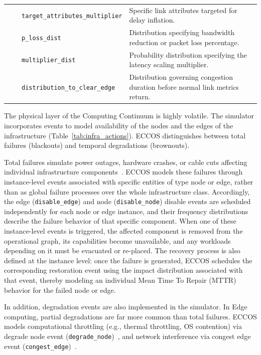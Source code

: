 \documentclass[ASNA]{USG} %
\begin{document}
\begin{center}
\begin{table}[!ht]
\begin{tabular*}{\textwidth}{@{\extracolsep\fill}ll l p{5cm}@{\extracolsep\fill}}
  & & \texttt{target\_attributes\_multiplier} & Specific link attributes targeted for delay inflation. \\
 & & \texttt{p\_loss\_dist} & Distribution specifying bandwidth reduction or packet loss percentage. \\
 & & \texttt{multiplier\_dist} & Probability distribution specifying the latency scaling multiplier. \\
 & & \texttt{distribution\_to\_clear\_edge} & Distribution governing congestion duration before normal link metrics return. \\
\bottomrule
\end{tabular*}
\end{table}
\end{center}


The physical layer of the Computing Continuum is highly volatile. The simulator incorporates events to model availability of the nodes and the edges of the infrastructure (Table~\ref{tab:infra_actions}). \textsc{ECCOS} distinguishes between total failures (blackouts) and temporal degradations (brownouts).


Total failures simulate power outages, hardware crashes, or cable cuts affecting individual infrastructure components~\cite{Pereira2021Availability}. \textsc{ECCOS} models these failures through instance-level events associated with specific entities of type node or edge, rather than as global failure processes over the whole infrastructure class. Accordingly, the edge (\texttt{disable\_edge}) and node (\texttt{disable\_node}) disable events are scheduled independently for each node or edge instance, and their frequency distributions describe the failure behavior of that specific component. When one of these instance-level events is triggered, the affected component is removed from the operational graph, its capabilities become unavailable, and any workloads depending on it must be evacuated or re-placed. The recovery process is also defined at the instance level: once the failure is generated, \textsc{ECCOS} schedules the corresponding restoration event using the impact distribution associated with that event, thereby modeling an individual Mean Time To Repair (MTTR) behavior for the failed node or edge.

In addition, degradation events are also implemented in the simulator. In Edge computing, partial degradations are far more common than total failures. \textsc{ECCOS} models computational throttling (e.g., thermal throttling, OS contention) via degrade node event (\texttt{degrade\_node})~\cite{Bantock2020Mitigating}, and network interference via congest edge event (\texttt{congest\_edge})~\cite{Zhang2022Optimal}. 
\end{document}
